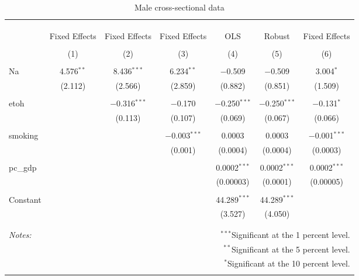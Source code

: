 \documentclass[11pt]{article}\usepackage[]{graphicx}\usepackage[]{color}
\begin{document}
\begin{table}[!htbp] \centering 
  \caption{Male cross-sectional data} 
  \label{tab:mfe} 
\begin{tabular}{@{\extracolsep{5pt}}lcccccc} 
\\[-1.8ex]\hline 
\hline \\[-1.8ex] 
\\[-1.8ex] & \multicolumn{6}{c}{ } \\ 
 & Fixed Effects & Fixed Effects & Fixed Effects & OLS & Robust & Fixed Effects \\ 
\\[-1.8ex] & (1) & (2) & (3) & (4) & (5) & (6)\\ 
\hline \\[-1.8ex] 
 Na & 4.576$^{**}$ & 8.436$^{***}$ & 6.234$^{**}$ & $-$0.509 & $-$0.509 & 3.004$^{*}$ \\ 
  & (2.112) & (2.566) & (2.859) & (0.882) & (0.851) & (1.509) \\ 
  & & & & & & \\ 
 etoh &  & $-$0.316$^{***}$ & $-$0.170 & $-$0.250$^{***}$ & $-$0.250$^{***}$ & $-$0.131$^{*}$ \\ 
  &  & (0.113) & (0.107) & (0.069) & (0.067) & (0.066) \\ 
  & & & & & & \\ 
 smoking &  &  & $-$0.003$^{***}$ & 0.0003 & 0.0003 & $-$0.001$^{***}$ \\ 
  &  &  & (0.001) & (0.0004) & (0.0004) & (0.0003) \\ 
  & & & & & & \\ 
 pc\_gdp &  &  &  & 0.0002$^{***}$ & 0.0002$^{***}$ & 0.0002$^{***}$ \\ 
  &  &  &  & (0.00003) & (0.0001) & (0.00005) \\ 
  & & & & & & \\ 
 Constant &  &  &  & 44.289$^{***}$ & 44.289$^{***}$ &  \\ 
  &  &  &  & (3.527) & (4.050) &  \\ 
  & & & & & & \\ 
\hline 
\hline \\[-1.8ex] 
\textit{Notes:} & \multicolumn{6}{r}{$^{***}$Significant at the 1 percent level.} \\ 
 & \multicolumn{6}{r}{$^{**}$Significant at the 5 percent level.} \\ 
 & \multicolumn{6}{r}{$^{*}$Significant at the 10 percent level.} \\ 
 & \multicolumn{6}{r}{} \\ 
\end{tabular} 
\end{table} 
\end{document}
